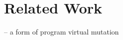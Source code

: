 
\section{Related Work}
\label{sec:related-work}

\cite{Tokumoto2016} -- a form of program virtual mutation
